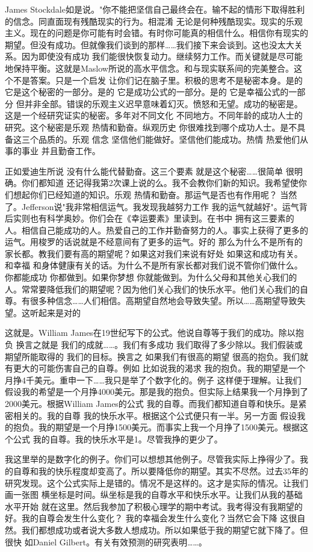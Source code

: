 James Stockdale如是说。"你不能把坚信自己最终会在。输不起的情形下取得胜利的信念。同直面现有残酷现实的行为。相混淆 无论是何种残酷现实。现实的乐观主义。现在的问题是你可能有时会错。有时你可能真的相信什么。相信你有现实的期望。但没有成功。但就像我们谈到的那样……我们接下来会谈到。这也没太大关系。因为即使没有成功 我们能很快恢复动力。继续努力工作。而关键就是尽可能地保持平衡。这就是Maslow所说的高水平信念。和与现实联系间的完美整合。这个不是答案。只是一个启发 让你们记在脑子里。积极的思考不是秘密本身。是的 它是这个秘密的一部分。是的 它是成功公式的一部分。是的 它是幸福公式的一部分 但并非全部。错误的乐观主义迟早意味着幻灭。愤怒和无望。成功的秘密是。这是一个经研究证实的秘密。多年对不同文化 不同地方。不同年龄的成功人士的研究。这个秘密是乐观 热情和勤奋。纵观历史 你很难找到哪个成功人士。是不具备这三个品质的。乐观 信念 坚信他们能做好。坚信他们能成功。热情 热爱他们从事的事业 并且勤奋工作。 

正如爱迪生所说 没有什么能代替勤奋。这三个要素 就是这个秘密……很简单 很明确。你们都知道 还记得我第2次课上说的么。我不会教你们新的知识。我希望使你们想起你们已经知道的知识。乐观 热情和勤奋。那运气是否也有作用呢？ 当然了。Jefferson说"我非常相信运气。我发现我越努力工作 我的运气就越好"。运气背后实则也有科学奥妙。你们会在《幸运要素》里读到。在书中 拥有这三要素的人。相信自己能成功的人。热爱自己的工作并勤奋努力的人。事实上获得了更多的运气。用梭罗的话说就是不经意间有了更多的运气。好的 那么为什么不是所有的家长都。教我们要有高的期望呢？如果这对我们来说有好处 如果这和成功有关。和幸福 和身体健康有关的话。为什么不是所有家长都对我们说不管你们做什么。你都能成功 你都做到。如果你梦想 你就能做到。为什么父母和其他关心我们的人。常常要降低我们的期望呢？因为他们关心我们的快乐水平。他们关心我们的自尊。有很多种信念……人们相信。高期望自然地会导致失望。所以……高期望导致失望。这听起来是对的 

这就是。William James在19世纪写下的公式。他说自尊等于我们的成功。除以抱负 换言之就是 我们的成就……。我们有多成功 我们取得了多少除以。我们假装或期望所能取得的 我们的目标。换言之 如果我们有很高的期望 很高的抱负。我们就有更大的可能伤害自己的自尊。例如 比如说我的渴求 我的抱负。我的期望是一个月挣4千美元。重申一下……我只是举了个数字化的。例子 这样便于理解。让我们假设我的希望是一个月挣4000美元。那是我的抱负。但实际上结果我一个月挣到了2000美元。根据William James的公式 我的自尊。而我们都知道自尊和快乐。是紧密相关的。我的自尊 我的快乐水平。根据这个公式便只有一半。另一方面 假设我的抱负。我的期望是一个月挣1500美元。而事实上我一个月挣了1500美元。根据这个公式 我的自尊。我的快乐水平是1。尽管我挣的更少了。 

我这里举的是数字化的例子。你们可以想想其他例子。尽管我实际上挣得少了。我的自尊和我的快乐程度却变高了。所以要降低你的期望。其实不尽然。过去35年的研究发现。这个公式实际上是错的。情况不是这样的。这才是实际的情况。让我们画一张图 横坐标是时间。纵坐标是我的自尊水平和快乐水平。让我们从我的基础水平开始 就在这里。然后我参加了积极心理学的期中考试。我考得没有我期望的好。我的自尊会发生什么变化？ 我的幸福会发生什么变化？当然它会下降 这很自然。我们都想成功或者说大多数人想成功。所以如果低于我的期望它就下降了。但很快 如Daniel Gilbert。有关有效预测的研究表明……。 

